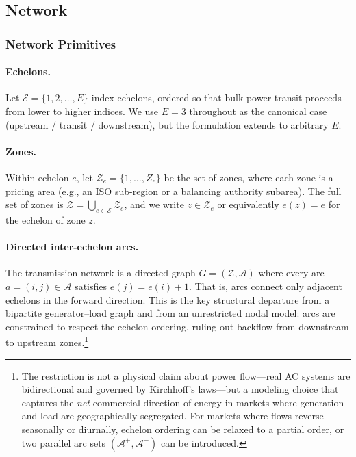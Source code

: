 \documentclass[12pt,letterpaper]{article}
\begin{document}
\subsection{Network}
\label{sec:network}

\subsubsection{Network Primitives}

\paragraph{Echelons.} Let $\mathcal{E} = \{1, 2, \dots, E\}$ index echelons,
ordered so that bulk power transit proceeds from lower to higher indices.
We use $E = 3$ throughout as the canonical case (upstream / transit /
downstream), but the formulation extends to arbitrary $E$.

\paragraph{Zones.} Within echelon $e$, let $\mathcal{Z}_e = \{1, \dots, Z_e\}$
be the set of zones, where each zone is a pricing area (e.g., an ISO
sub-region or a balancing authority subarea). The full set of zones is
$\mathcal{Z} = \bigcup_{e \in \mathcal{E}} \mathcal{Z}_e$, and we write
$z \in \mathcal{Z}_e$ or equivalently $e(z) = e$ for the echelon of zone $z$.

\paragraph{Directed inter-echelon arcs.} The transmission network is a
directed graph $G = (\mathcal{Z}, \mathcal{A})$ where every arc
$a = (i, j) \in \mathcal{A}$ satisfies $e(j) = e(i) + 1$. That is, arcs
connect only adjacent echelons in the forward direction. This is the key
structural departure from a bipartite generator--load graph and from an
unrestricted nodal model: arcs are constrained to respect the echelon
ordering, ruling out backflow from downstream to upstream zones.\footnote{The
restriction is not a physical claim about power flow---real AC systems are
bidirectional and governed by Kirchhoff's laws---but a modeling choice that
captures the \emph{net} commercial direction of energy in markets where
generation and load are geographically segregated. For markets where flows
reverse seasonally or diurnally, echelon ordering can be relaxed to a
partial order, or two parallel arc sets $(\mathcal{A}^+, \mathcal{A}^-)$
can be introduced.}
\end{document}
